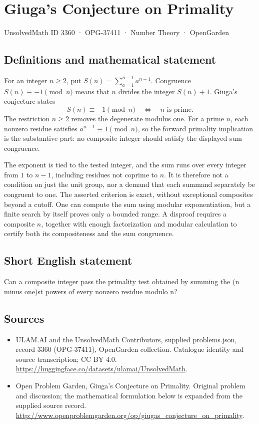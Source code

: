 \documentclass[11pt,a4paper]{article}
\begin{document}
\section*{Giuga's Conjecture on Primality}\label{3360}
{\small UnsolvedMath ID 3360 · OPG-37411 · Number Theory · OpenGarden}
\subsection{Definitions and mathematical statement}
For an integer $n\ge2$, put $S(n)=\sum_{a=1}^{n-1}a^{n-1}$.
Congruence $S(n)\equiv-1\pmod n$ means that $n$ divides the integer
$S(n)+1$. Giuga's conjecture states
\[
 S(n)\equiv-1\pmod n\quad\Longleftrightarrow\quad n\text{ is prime}.
\]
The restriction $n\ge2$ removes the degenerate modulus one. For a
prime $n$, each nonzero residue satisfies $a^{n-1}\equiv1\pmod n$,
so the forward primality implication is the substantive part:
no composite integer should satisfy the displayed sum congruence.

The exponent is tied to the tested integer, and the sum runs over
every integer from $1$ to $n-1$, including residues not coprime to $n$.
It is therefore not a condition on just the unit group, nor a demand
that each summand separately be congruent to one. The asserted
criterion is exact, without exceptional composites beyond a cutoff.
One can compute the sum using modular exponentiation, but a finite
search by itself proves only a bounded range. A disproof requires
a composite $n$, together with enough factorization and modular
calculation to certify both its compositeness and the sum congruence.
\subsection{Short English statement}
Can a composite integer pass the primality test obtained by summing the (n minus one)st powers of every nonzero residue modulo n?
\subsection{Sources}
\begin{itemize}
\item[S1] ULAM.AI and the UnsolvedMath Contributors, supplied problems.json, record 3360 (OPG-37411), OpenGarden collection. Catalogue identity and source transcription; CC BY 4.0.
\url{https://huggingface.co/datasets/ulamai/UnsolvedMath}.
\item[S2] Open Problem Garden, Giuga's Conjecture on Primality. Original problem and discussion; the mathematical formulation below is expanded from the supplied source record.
\url{http://www.openproblemgarden.org/op/giugas_conjecture_on_primality}.
\end{itemize}
\end{document}
